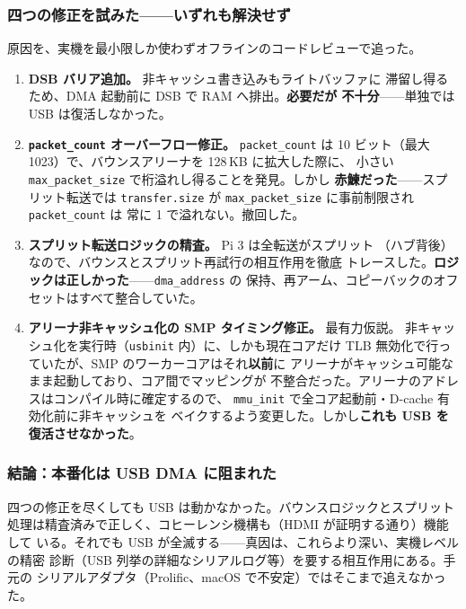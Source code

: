\subsubsection*{四つの修正を試みた——いずれも解決せず}

原因を、実機を最小限しか使わずオフラインのコードレビューで追った。

\begin{enumerate}[leftmargin=1.6em]
  \item \textbf{DSB バリア追加。} 非キャッシュ書き込みもライトバッファに
        滞留し得るため、DMA 起動前に DSB で RAM へ排出。\textbf{必要だが
        不十分}——単独では USB は復活しなかった。

  \item \textbf{\texttt{packet\_count} オーバーフロー修正。} \texttt{packet\_count}
        は 10 ビット（最大 1023）で、バウンスアリーナを 128\,KB に拡大した際に、
        小さい \texttt{max\_packet\_size} で桁溢れし得ることを発見。しかし
        \textbf{赤鰊だった}——スプリット転送では \texttt{transfer.size} が
        \texttt{max\_packet\_size} に事前制限され \texttt{packet\_count} は
        常に 1 で溢れない。撤回した。

  \item \textbf{スプリット転送ロジックの精査。} Pi 3 は全転送がスプリット
        （ハブ背後）なので、バウンスとスプリット再試行の相互作用を徹底
        トレースした。\textbf{ロジックは正しかった}——\texttt{dma\_address} の
        保持、再アーム、コピーバックのオフセットはすべて整合していた。

  \item \textbf{アリーナ非キャッシュ化の SMP タイミング修正。} 最有力仮説。
        非キャッシュ化を実行時（\texttt{usbinit} 内）に、しかも現在コアだけ
        TLB 無効化で行っていたが、SMP のワーカーコアはそれ\textbf{以前}に
        アリーナがキャッシュ可能なまま起動しており、コア間でマッピングが
        不整合だった。アリーナのアドレスはコンパイル時に確定するので、
        \texttt{mmu\_init} で全コア起動前・D-cache 有効化前に非キャッシュを
        ベイクするよう変更した。しかし\textbf{これも USB を復活させなかった}。
\end{enumerate}

\subsubsection*{結論：本番化は USB DMA に阻まれた}

四つの修正を尽くしても USB は動かなかった。バウンスロジックとスプリット
処理は精査済みで正しく、コヒーレンシ機構も（HDMI が証明する通り）機能して
いる。それでも USB が全滅する——真因は、これらより深い、実機レベルの精密
診断（USB 列挙の詳細なシリアルログ等）を要する相互作用にある。手元の
シリアルアダプタ（Prolific、macOS で不安定）ではそこまで追えなかった。

